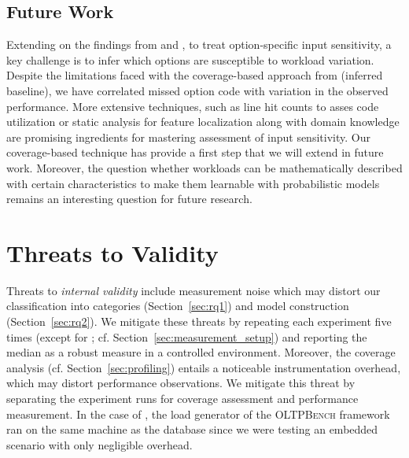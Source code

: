 {{

\subsection{Future Work}
Extending on the findings from  and , to treat
option-specific input sensitivity, a key challenge is to infer
which options are susceptible to workload variation. Despite the
limitations faced with the coverage-based approach from 
(inferred baseline), we have correlated missed option code with
variation in the observed performance. More extensive techniques, such as line hit counts to asses code utilization or static analysis for feature localization along with domain knowledge are promising ingredients
for mastering assessment of input sensitivity. Our coverage-based technique has provide a first step that we will extend in future work. Moreover, the question whether workloads can be mathematically described with certain characteristics to make them learnable with probabilistic models remains an interesting question for future research.


\section{Threats to Validity}\label{sec:threats}
\color{blue}
Threats to \textit{internal validity} include measurement noise which may distort our classification into categories (Section~\ref{sec:rq1}) and model construction (Section~\ref{sec:rq2}). We mitigate these threats by repeating each experiment five times  (except for \htwo; cf. Section~\ref{sec:measurement_setup}) and reporting the median as a robust measure in a controlled environment. Moreover, the coverage analysis (cf. Section~\ref{sec:profiling}) entails a noticeable instrumentation overhead, which may distort performance observations. We mitigate this threat by separating the experiment runs for coverage assessment and performance measurement. In the case of \htwo, the load generator of the \textsc{OLTPBench} framework~\cite{difallah_oltp_2013} ran on the same machine as the database since we were testing an embedded scenario with only negligible overhead. 	
	
}}
